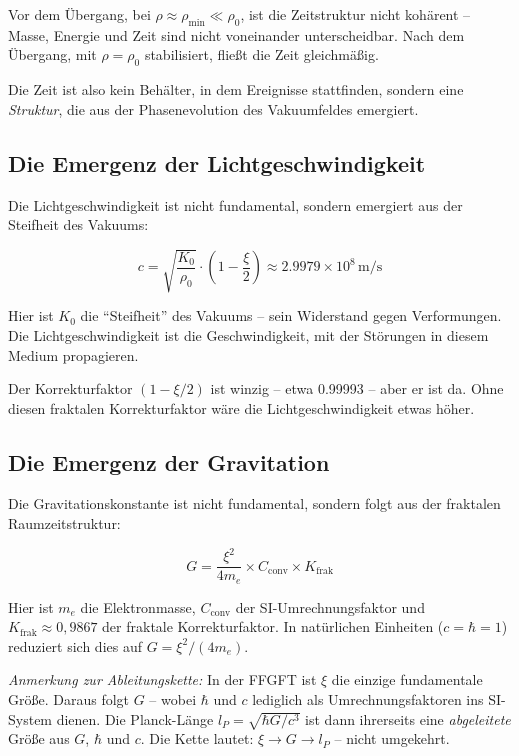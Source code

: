 	Vor dem Übergang, bei $\rho \approx \rho_{\min} \ll \rho_0$, ist die Zeitstruktur nicht kohärent -- Masse, Energie und Zeit sind nicht voneinander unterscheidbar. Nach dem Übergang, mit $\rho = \rho_0$ stabilisiert, fließt die Zeit gleichmäßig.
	
	Die Zeit ist also kein Behälter, in dem Ereignisse stattfinden, sondern eine \textit{Struktur}, die aus der Phasenevolution des Vakuumfeldes emergiert.
	
	\subsection{Die Emergenz der Lichtgeschwindigkeit}
	
	Die Lichtgeschwindigkeit ist nicht fundamental, sondern emergiert aus der Steifheit des Vakuums:
	
	\begin{equation}
		c = \sqrt{\frac{K_0}{\rho_0}} \cdot \left(1 - \frac{\xi}{2}\right) \approx 2.9979 \times 10^8 \, \text{m/s}
	\end{equation}
	
	Hier ist $K_0$ die \enquote{Steifheit} des Vakuums -- sein Widerstand gegen Verformungen. Die Lichtgeschwindigkeit ist die Geschwindigkeit, mit der Störungen in diesem Medium propagieren.
	
	Der Korrekturfaktor $(1 - \xi/2)$ ist winzig -- etwa 0.99993 -- aber er ist da. Ohne diesen fraktalen Korrekturfaktor wäre die Lichtgeschwindigkeit etwas höher.
	
	\subsection{Die Emergenz der Gravitation}
	
	Die Gravitationskonstante ist nicht fundamental, sondern folgt aus der fraktalen Raumzeitstruktur:
	
	\begin{equation}
		G = \frac{\xi^2}{4 m_e} \times C_{\text{conv}} \times K_{\text{frak}}
	\end{equation}
	
	Hier ist $m_e$ die Elektronmasse, $C_{\text{conv}}$ der SI-Umrechnungsfaktor und $K_{\text{frak}} \approx 0{,}9867$ der fraktale Korrekturfaktor. In natürlichen Einheiten ($c = \hbar = 1$) reduziert sich dies auf $G = \xi^2/(4 m_e)$.
	
	\textit{Anmerkung zur Ableitungskette:} In der FFGFT ist $\xi$ die einzige fundamentale Größe. Daraus folgt $G$ -- wobei $\hbar$ und $c$ lediglich als Umrechnungsfaktoren ins SI-System dienen. Die Planck-Länge $l_P = \sqrt{\hbar G/c^3}$ ist dann ihrerseits eine \textit{abgeleitete} Größe aus $G$, $\hbar$ und $c$. Die Kette lautet: $\xi \to G \to l_P$ -- nicht umgekehrt.
	
